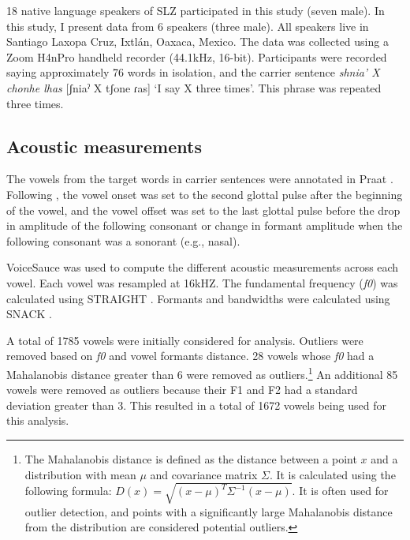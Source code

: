 \documentclass[12pt, letterpaper]{article}
\begin{document}
18 native language speakers of SLZ participated in this study (seven male). In this study, I present data from 6 speakers (three male). All speakers live in Santiago Laxopa Cruz, Ixtlán, Oaxaca, Mexico. The data was collected using a Zoom H4nPro handheld recorder (44.1kHz, 16-bit). Participants were recorded saying approximately 76 words in isolation, and the carrier sentence \textit{shnia' X chonhe lhas} [ʃniaˀ X tʃone ɾas] `I say X three times'. This phrase was repeated three times. 

\subsection{Acoustic measurements} \label{sec:Acoustics}

The vowels from the target words in carrier sentences were annotated in Praat \citep{boersmaPraatDoingPhonetics2021}. Following \citet{garellekAcousticDiscriminabilityComplex2020}, the vowel onset was set to the second glottal pulse after the beginning of the vowel, and the vowel offset was set to the last glottal pulse before the drop in amplitude of the following consonant or change in formant amplitude when the following consonant was a sonorant (e.g., nasal). 

VoiceSauce \citep{shueVOICESAUCEProgramVoice2009} was used to compute the different acoustic measurements across each vowel. Each vowel was resampled at 16kHZ. The fundamental frequency (\textit{f0}) was calculated using STRAIGHT \citep{kawaharaInstantaneousfrequencybasedPitchExtraction1998}. Formants and bandwidths were calculated using SNACK \citep{sjolanderSnackSoundToolkit2004}.

A total of 1785 vowels were initially considered for analysis. Outliers were removed based on \textit{f0} and vowel formants distance. 28 vowels whose \textit{f0} had a Mahalanobis distance greater than 6 were removed as outliers.\footnote{The Mahalanobis distance is defined as the distance between a point $x$ and a distribution with mean $\mu$ and covariance matrix $\Sigma$. It is calculated using the following formula: $D(x) = \sqrt{ (x - \mu)^T \Sigma^{-1} (x - \mu) }$. It is often used for outlier detection, and points with a significantly large Mahalanobis distance from the distribution are considered potential outliers.} An additional 85 vowels were removed as outliers because their F1 and F2 had a standard deviation greater than 3. This resulted in a total of 1672 vowels being used for this analysis.
\end{document}
